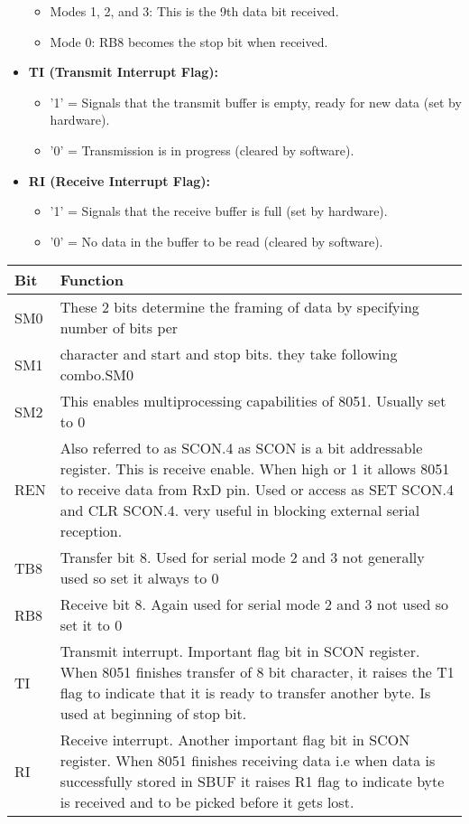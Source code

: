 \documentclass[
]{article}
\begin{document}
\begin{itemize}
  \begin{itemize}
  \item
    Modes 1, 2, and 3: This is the 9th data bit received.
  \item
    Mode 0: RB8 becomes the stop bit when received.
  \end{itemize}
\item
  \textbf{TI (Transmit Interrupt Flag):}

  \begin{itemize}
  \item
    '1' = Signals that the transmit buffer is empty, ready for new data
    (set by hardware).
  \item
    '0' = Transmission is in progress (cleared by software).
  \end{itemize}
\item
  \textbf{RI (Receive Interrupt Flag):}

  \begin{itemize}
  \item
    '1' = Signals that the receive buffer is full (set by hardware).
  \item
    '0' = No data in the buffer to be read (cleared by software).
  \end{itemize}
\end{itemize}

\begin{longtable}[]{@{}ll@{}}
\toprule
Bit & Function \\
\midrule
\endhead
SM0 & These 2 bits determine the framing of data by specifying number of
bits per \\
SM1 & character and start and stop bits. they take following
combo.SM0 \\
SM2 & This enables multiprocessing capabilities of 8051. Usually set to
0 \\
REN & Also referred to as SCON.4 as SCON is a bit addressable register.
This is receive enable. When high or 1 it allows 8051 to receive data
from RxD pin. Used or access as SET SCON.4 and CLR SCON.4. very useful
in blocking external serial reception. \\
TB8 & Transfer bit 8. Used for serial mode 2 and 3 not generally used so
set it always to 0 \\
RB8 & Receive bit 8. Again used for serial mode 2 and 3 not used so set
it to 0 \\
TI & Transmit interrupt. Important flag bit in SCON register. When 8051
finishes transfer of 8 bit character, it raises the T1 flag to indicate
that it is ready to transfer another byte. Is used at beginning of stop
bit. \\
RI & Receive interrupt. Another important flag bit in SCON register.
When 8051 finishes receiving data i.e when data is successfully stored
in SBUF it raises R1 flag to indicate byte is received and to be picked
before it gets lost. \\
\bottomrule
\end{longtable}
\end{document}
